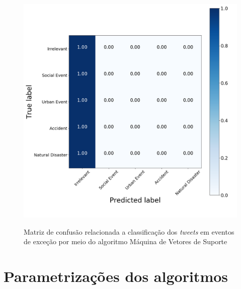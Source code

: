 \documentclass[
	12pt,				%
	oneside,			%
	a4paper,			%
	english,			%
	brazil				%
	]{abntex2ppgsi}
\begin{document}
\begin{apendicesenv}
\begin{figure}[!htb]
	\centering
 	  \caption{Matriz de confusão relacionada a classificação dos \textit{tweets} em eventos de exceção por meio do algoritmo Máquina de Vetores de Suporte}
		\includegraphics[width=1\linewidth]{images/confusion_matrix_svm.png}
	\label{fig:confusion_matrix_svm}
\end{figure}

\chapter{Parametrizações dos algoritmos}
\label{apendiceF}


\end{apendicesenv}
\end{document}
